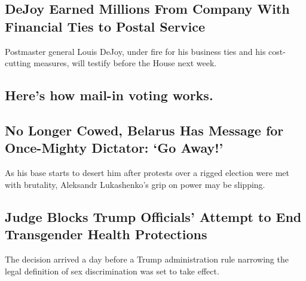 \hypertarget{dejoy-earned-millions-from-company-with-financial-ties-to-postal-service}{%
\subsection{DeJoy Earned Millions From Company With Financial Ties to
Postal
Service}\label{dejoy-earned-millions-from-company-with-financial-ties-to-postal-service}}

Postmaster general Louis DeJoy, under fire for his business ties and his
cost-cutting measures, will testify before the House next week.

\href{/article/Vote-by-mail.html}{}

\hypertarget{heres-how-mail-in-voting-works}{%
\subsection{Here's how mail-in voting
works.}\label{heres-how-mail-in-voting-works}}

\href{/2020/08/17/world/europe/belarus-lukashenko-protests.html}{}

\hypertarget{no-longer-cowed-belarus-has-message-for-once-mighty-dictator-go-away}{%
\subsection{No Longer Cowed, Belarus Has Message for Once-Mighty
Dictator: `Go
Away!'}\label{no-longer-cowed-belarus-has-message-for-once-mighty-dictator-go-away}}

\href{/2020/08/17/world/europe/belarus-lukashenko-protests.html}{}

As his base starts to desert him after protests over a rigged election
were met with brutality, Aleksandr Lukashenko's grip on power may be
slipping.

\href{/2020/08/17/us/politics/trump-court-transgender-rights.html}{}

\hypertarget{judge-blocks-trump-officials-attempt-to-end-transgender-health-protections}{%
\subsection{Judge Blocks Trump Officials' Attempt to End Transgender
Health
Protections}\label{judge-blocks-trump-officials-attempt-to-end-transgender-health-protections}}

The decision arrived a day before a Trump administration rule narrowing
the legal definition of sex discrimination was set to take effect.

